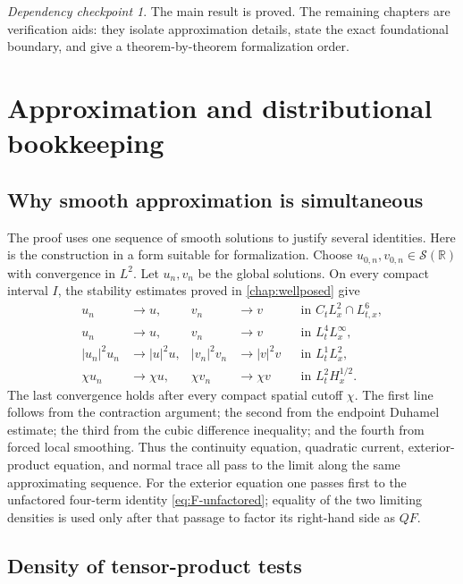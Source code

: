 \documentclass[11pt,oneside]{book}
\theoremstyle{definition}
\theoremstyle{remark}
\newtheorem{checkpoint}[theorem]{Dependency checkpoint}
\newcommand{\R}{\mathbb R}
\newcommand{\Ssch}{\mathcal S}
\newcommand{\1}{\mathbf 1}
\begin{document}
\begin{checkpoint}
The main result is proved.  The remaining chapters are verification aids:
they isolate approximation details, state the exact foundational boundary,
and give a theorem-by-theorem formalization order.
\end{checkpoint}

\appendix

\chapter{Approximation and distributional bookkeeping}\label{app:bookkeeping}

\section{Why smooth approximation is simultaneous}
The proof uses one sequence of smooth solutions to justify several identities.
Here is the construction in a form suitable for formalization.  Choose
$u_{0,n},v_{0,n}\in\Ssch(\R)$ with convergence in $L^2$.  Let $u_n,v_n$ be
the global solutions.  On every compact interval $I$, the stability estimates
proved in \cref{chap:wellposed} give
\begin{align*}
 u_n&\to u,
 &v_n&\to v
 &&\text{in }C_tL^2_x\cap L^6_{t,x},\\
 u_n&\to u,
 &v_n&\to v
 &&\text{in }L^4_tL^\infty_x,\\
 |u_n|^2u_n&\to|u|^2u,
 &|v_n|^2v_n&\to|v|^2v
 &&\text{in }L^1_tL^2_x,\\
 \chi u_n&\to\chi u,
 &\chi v_n&\to\chi v
 &&\text{in }L^2_tH^{1/2}_x.
\end{align*}
The last convergence holds after every compact spatial cutoff $\chi$.
The first line follows from the contraction argument; the second from the
endpoint Duhamel estimate; the third from the cubic difference inequality;
and the fourth from forced local smoothing.  Thus the continuity equation,
quadratic current, exterior-product equation, and normal trace all pass to the
limit along the same approximating sequence.  For the exterior equation one
passes first to the unfactored four-term identity
\eqref{eq:F-unfactored}; equality of the two limiting densities is used only
after that passage to factor its right-hand side as $QF$.

\section{Density of tensor-product tests}
\end{document}
